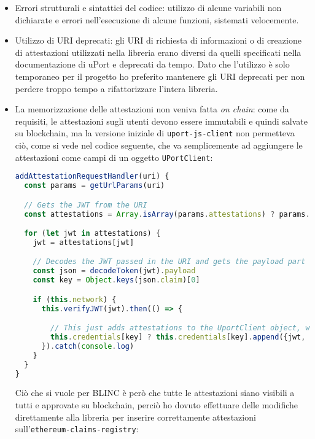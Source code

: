 \begin{itemize}
  \item Errori strutturali e sintattici del codice: utilizzo di alcune variabili non dichiarate
  e errori nell'esecuzione di alcune funzioni, sistemati velocemente.
  \item Utilizzo di URI deprecati: gli URI di richiesta di informazioni o di creazione di attestazioni utilizzati nella libreria erano
  diversi da quelli specificati nella documentazione di uPort e deprecati da tempo.
  Dato che l'utilizzo è solo temporaneo per il progetto ho preferito mantenere gli URI
  deprecati per non perdere troppo tempo a rifattorizzare l'intera libreria.
  \item La memorizzazione delle attestazioni non veniva fatta \emph{on chain}: 
  come da requisiti, le attestazioni sugli utenti devono essere immutabili e quindi salvate su blockchain, ma la versione iniziale di
  \texttt{uport-js-client} non permetteva ciò, come si vede nel codice seguente,
  che va semplicemente ad aggiungere le attestazioni come campi di un oggetto
  \texttt{UPortClient}:

  \begin{lstlisting}[language=JavaScript, numbers=none]
addAttestationRequestHandler(uri) {
  const params = getUrlParams(uri)

  // Gets the JWT from the URI
  const attestations = Array.isArray(params.attestations) ? params.attestations : [params.attestations]

  for (let jwt in attestations) {
    jwt = attestations[jwt]

    // Decodes the JWT passed in the URI and gets the payload part
    const json = decodeToken(jwt).payload
    const key = Object.keys(json.claim)[0]

    if (this.network) {
      this.verifyJWT(jwt).then(() => {

        // This just adds attestations to the UportClient object, while we want attestations to be stored on the blockchain
        this.credentials[key] ? this.credentials[key].append({jwt, json}) : this.credentials[key] = [{jwt, json}]
      }).catch(console.log)
    }
  }
}
  \end{lstlisting}

  Ciò che si vuole per BLINC è però che tutte le attestazioni siano visibili a tutti
  e approvate su blockchain, perciò ho dovuto effettuare delle modifiche direttamente
  alla libreria per inserire correttamente attestazioni 
  sull'\texttt{ethereum-claims-registry}:


\end{itemize}
